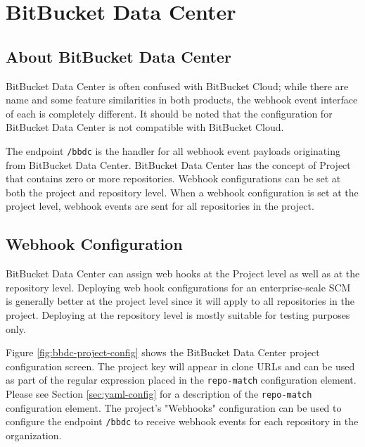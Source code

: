 \chapter{BitBucket Data Center}

\section{About BitBucket Data Center}

BitBucket Data Center is often confused with BitBucket Cloud; while there are name and some
feature similarities in both products, the webhook event interface of each is completely different.
It should be noted that the \cxoneflow configuration for BitBucket Data Center is not compatible with BitBucket Cloud.

The \cxoneflow endpoint \texttt{/bbdc} is the handler for all webhook event
payloads originating from BitBucket Data Center.  BitBucket Data Center has the concept of Project that
contains zero or more repositories.  Webhook configurations can be set at both the project and repository
level.  When a webhook configuration is set at the project level, webhook events are sent for all
repositories in the project.


\section{Webhook Configuration}

BitBucket Data Center can assign web hooks at the Project level as well as at the
repository level.  Deploying web hook configurations for an enterprise-scale SCM is generally better
at the project level since it will apply to all repositories in the project.  Deploying
at the repository level is mostly suitable for testing purposes only.

Figure \ref{fig:bbdc-project-config} shows the BitBucket Data Center project configuration screen.  The
project key will appear in clone URLs and can be used as part of the regular expression 
placed in the \texttt{repo-match} configuration element.  Please see Section \ref{sec:yaml-config} 
for a description of the \texttt{repo-match} configuration element. The project's "Webhooks" configuration
can be used to configure the \cxoneflow endpoint \texttt{/bbdc} to receive webhook events for each repository in the organization.  

